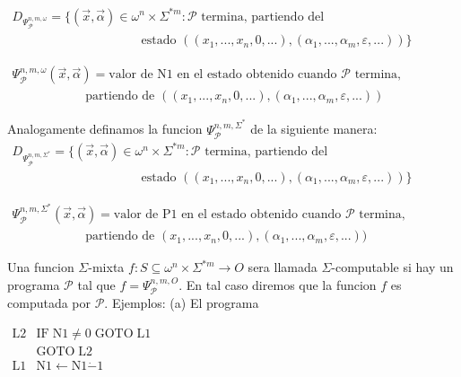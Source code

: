 \(\displaystyle \begin{array}{l} D_{\Psi _{\mathcal{P}}^{n,m,\omega }}=\{(\vec{x},\vec{\alpha})\in \omega ^{n}\times \Sigma ^{\ast m}:\mathcal{P}\text{ termina, partiendo del} \\ \;\;\;\;\;\;\;\;\;\;\;\;\;\;\;\;\;\;\;\;\;\;\;\;\;\;\;\;\;\;\;\;\;\;\;\;\; \text{estado }((x_{1},...,x_{n},0,...),(\alpha _{1},...,\alpha _{m},\varepsilon ,...))\} \end{array} \)

\(\displaystyle \begin{array}{l} \Psi _{\mathcal{P}}^{n,m,\omega }(\vec{x},\vec{\alpha})=\text{valor de } \mathrm{N}1\text{ en el estado obtenido cuando }\mathcal{P}\text{ termina,} \\ \;\;\;\;\;\;\;\;\;\;\;\;\;\;\;\;\;\;\;\;\;\text{partiendo de } ((x_{1},...,x_{n},0,...),(\alpha _{1},...,\alpha _{m},\varepsilon ,...)) \end{array} \)

Analogamente definamos la funcion \(\Psi _{\mathcal{P}}^{n,m,\Sigma ^{\ast }}\) de la siguiente manera:
\(\displaystyle \begin{array}{l} D_{\Psi _{\mathcal{P}}^{n,m,\Sigma ^{\ast }}}=\{(\vec{x},\vec{\alpha})\in \omega ^{n}\times \Sigma ^{\ast m}:\mathcal{P}\text{ termina, partiendo del} \\ \;\;\;\;\;\;\;\;\;\;\;\;\;\;\;\;\;\;\;\;\;\;\;\;\;\;\;\;\;\;\;\;\;\;\;\;\; \text{estado }((x_{1},...,x_{n},0,...),(\alpha _{1},...,\alpha _{m},\varepsilon ,...))\} \end{array} \)

\(\displaystyle \begin{array}{l} \Psi _{\mathcal{P}}^{n,m,\Sigma ^{\ast }}(\vec{x},\vec{\alpha})=\text{valor de }\mathrm{P}1\text{ en el estado obtenido cuando }\mathcal{P}\text{ termina,} \\ \;\;\;\;\;\;\;\;\;\;\;\;\;\;\;\;\;\;\;\;\;\text{partiendo de } (x_{1},...,x_{n},0,...),(\alpha _{1},...,\alpha _{m},\varepsilon ,...)) \end{array} \)

Una funcion \(\Sigma \)-mixta \(f:S\subseteq \omega ^{n}\times \Sigma ^{\ast m}\rightarrow O\) sera llamada \(\Sigma \)-computable si hay un programa \( \mathcal{P}\) tal que \(f=\Psi _{\mathcal{P}}^{n,m,O}\). En tal caso diremos que la funcion \(f\) es computada por \(\mathcal{P}\).
Ejemplos: (a) El programa

\(\displaystyle \begin{array}{ll} \mathrm{L}2 & \mathrm{IF}\;\mathrm{N}1\neq 0\;\mathrm{GOTO}\;\mathrm{L}1 \\ & \mathrm{GOTO}\;\mathrm{L}2 \\ \mathrm{L}1 & \mathrm{N}1\leftarrow \mathrm{N}1\dot{-}1 \end{array} \)

